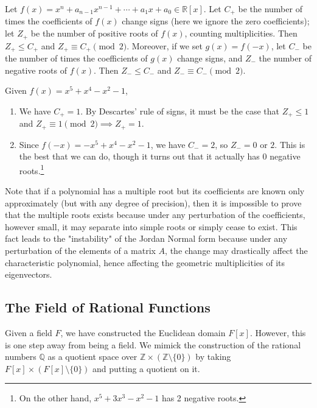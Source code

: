   \begin{theorem} 
    \label{thm:descartes}
    Let $f(x) = x^n + a_{n-1}x^{n-1} + \cdots + a_1x + a_0 \in \mathbb{R}[x]$. Let $C_+$ be the number of times the coefficients of $f(x)$ change signs (here we ignore the zero coefficients); let $Z_+$ be the number of positive roots of $f(x)$, counting multiplicities. Then $Z_+ \leq C_+$ and $Z_+ \equiv C_+ \pmod{2}$. Moreover, if we set $g(x) = f(-x)$, let $C_-$ be the number of times the coefficients of $g(x)$ change signs, and $Z_-$ the number of negative roots of $f(x)$. Then $Z_- \leq C_-$ and $Z_- \equiv C_- \pmod{2}$.
  \end{theorem}

  \begin{example}
    Given $f(x) = x^5 + x^4 - x^2 - 1$, 
    \begin{enumerate}
      \item We have $C_+ = 1$. By Descartes' rule of signs, it must be the case that $Z_+ \leq 1$ and $Z_+ \equiv 1 \pmod{2} \implies Z_+ = 1$. 
      \item Since $f(-x) = -x^5 + x^4 - x^2 - 1$, we have $C_- = 2$, so $Z_- = 0$ or $2$. This is the best that we can do, though it turns out that it actually has $0$ negative roots.\footnote{On the other hand, $x^5 + 3x^3 - x^2 - 1$ has 2 negative roots.} 
    \end{enumerate}
  \end{example}

  Note that if a polynomial has a multiple root but its coefficients are known only approximately (but with any degree of precision), then it is impossible to prove that the multiple roots exists because under any perturbation of the coefficients, however small, it may separate into simple roots or simply cease to exist. This fact leads to the "instability" of the Jordan Normal form because under any perturbation of the elements of a matrix $A$, the change may drastically affect the characteristic polynomial, hence affecting the geometric multiplicities of its eigenvectors. 

\subsection{The Field of Rational Functions}

  Given a field $F$, we have constructed the Euclidean domain $F[x]$. However, this is one step away from being a field. We mimick the construction of the rational numbers $\mathbb{Q}$ as a quotient space over $\mathbb{Z} \times (\mathbb{Z} \setminus \{0\})$ by taking $F[x] \times (F[x] \setminus \{0\})$ and putting a quotient on it. 
  
